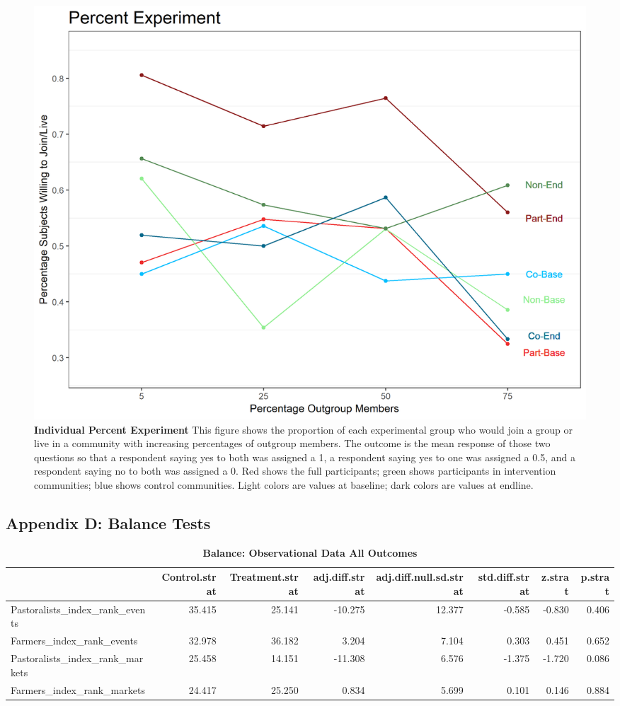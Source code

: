 \documentclass[
]{article}
\begin{document}
\begin{figure}[H]
\begin{center}
\includegraphics[width=.8\textwidth]{figs/randPan_plot.png}
\caption{\label{fig:percExp_plot_ind} \textbf{Individual Percent Experiment} This figure shows the proportion of each experimental group who would join a group or live in a community with increasing percentages of outgroup members. The outcome is the mean response of those two questions so that a respondent saying yes to both was assigned a 1, a respondent saying yes to one was assigned a 0.5, and a respondent saying no to both was assigned a 0. Red shows the full participants; green shows participants in intervention communities; blue shows control communities.  Light colors are values at baseline; dark colors are values at endline.}
\end{center}
\end{figure}

\hypertarget{appendix-d-balance-tests}{%
\subsection{Appendix D: Balance Tests}\label{appendix-d-balance-tests}}

\begin{table}[H]
\begin{center}
\label{tab:bal_obs_tab1}
\caption{\textbf{Balance: Observational Data All Outcomes}}
\smallskip

\begin{tabular}{l|r|r|r|r|r|r|r}
\hline
  & Control.strat & Treatment.strat & adj.diff.strat & adj.diff.null.sd.strat & std.diff.strat & z.strat & p.strat\\
\hline
Pastoralists\_index\_rank\_events & 35.415 & 25.141 & -10.275 & 12.377 & -0.585 & -0.830 & 0.406\\
\hline
Farmers\_index\_rank\_events & 32.978 & 36.182 & 3.204 & 7.104 & 0.303 & 0.451 & 0.652\\
\hline
Pastoralists\_index\_rank\_markets & 25.458 & 14.151 & -11.308 & 6.576 & -1.375 & -1.720 & 0.086\\
\hline
Farmers\_index\_rank\_markets & 24.417 & 25.250 & 0.834 & 5.699 & 0.101 & 0.146 & 0.884\\
\hline
\end{tabular}


\end{center}
\end{table}
\end{document}
